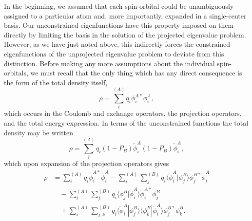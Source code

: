 \documentclass[12pt,letterpaper]{report}
\begin{document}
In the beginning, we assumed that each spin-orbital could be unambiguously assigned to a particular atom and, more importantly, expanded in a single-center basis. Our unconstrained eigenfunctions have this property imposed on them directly by limiting the basis in the solution of the projected eigenvalue problem. However, as we have just noted above, this indirectly forces the constrained eigenfunctions of the unprojected eigenvalue problem to deviate from this distinction. Before making any more assumptions about the individual spin-orbitals, we must recall that the only thing which has any direct consequence is the form of the total density itself,
\begin{equation}
\rho = \sum_i^{(A)} q_i \phi_i^{A*} \phi_i^A,
\end{equation}
which occurs in the Coulomb and exchange operators, the projection operators, and the total energy expression. In terms of the unconstrained functions the total density may be written
\begin{equation}
\rho = \sum_i^{(A)} q_i (1 - P_B) \tilde{\phi}_i^A (1 - P_B) \tilde{\phi}_i^A,
\end{equation}
which upon expansion of the projection operators gives
\begin{align}
\rho &= \sum_i^{(A)} q_i \tilde{\phi}_i^{A*} \tilde{\phi}_i^A - \sum_i^{(A)} \sum_j^{(B)} q_i \langle \tilde{\phi}_i^A | \phi_j^B \rangle \phi_j^{B*} \tilde{\phi}_i^A \nonumber\\
&\quad - \sum_i^{(A)} \sum_j^{(B)} q_i \langle \phi_j^B | \tilde{\phi}_i^A \rangle \tilde{\phi}_i^{A*} \phi_j^B \nonumber\\
&\quad + \sum_i^{(A)} \sum_{j,k}^{(B)} q_i \langle \tilde{\phi}_i^A | \phi_j^B \rangle \langle \phi_k^B | \tilde{\phi}_i^A \rangle \phi_j^{B*} \phi_k^B.
\end{align}
\end{document}
